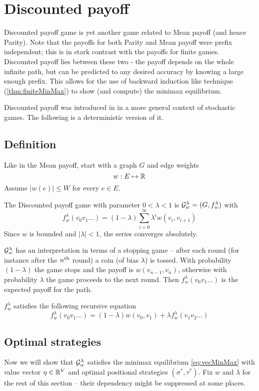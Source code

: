 \chapter{Discounted payoff}

Discounted payoff game is yet another game related to Mean payoff (and hence Parity). Note that the payoffs for both Parity and Mean payoff were prefix independent; this is in stark contrast with the payoffs for finite games. Discounted payoff lies between these two - the payoff depends on the whole infinite path, but can be predicted to any desired accuracy by knowing a large enough prefix. This allows for the use of backward induction like technique (\autoref{thm:finiteMinMax}) to show (and compute) the minimax equilibrium.

Discounted payoff was introduced in \cite{shapley_stochastic} in a more general context of stochastic games. The following is a deterministic version of it.

\section{Definition}
Like in the Mean payoff, start with a graph $G$ and edge weights
\[
    w : E \mapsto \mathbb{R}
\]
Assume $|w(e)| \leq W$ for every $e \in E$.

The Discounted payoff game with parameter $ 0 < \lambda < 1$ is $\mathcal{G}^\lambda_w=(G,f^\lambda_w)$ with
\[
    f^\lambda_w(v_0 v_1 \ldots ) =  (1-\lambda)\sum_{i=0}^\infty \lambda^i w(v_i,v_{i+1})
\]
Since $w$ is bounded and $|\lambda|<1$, the series converges absolutely.

$\mathcal{G}^\lambda_w$ has an interpretation in terms of a stopping game -- after each round (for instance after the ${n}^\text{th}$ round) a coin (of bias $\lambda$) is tossed. With probability $(1-\lambda)$ the game stops and the payoff is $w(v_{n-1},v_n)$, otherwise with probability $\lambda$ the game proceeds to the next round. Then $f^\lambda_w(v_0v_1 \ldots)$ is the expected payoff for the path.

$f^\lambda_w$ satisfies the following recursive equation
\begin{equation}
    f^\lambda_w(v_0 v_1 \ldots ) = (1-\lambda) w(v_0, v_1) + \lambda f^\lambda_w(v_1 v_2 \ldots) \label{eqn:disc-recursive}
\end{equation}
\section{Optimal strategies}
Now we will show that $\mathcal{G}^\lambda_w$ satisfies the minimax equilibrium \eqref{eq:vecMinMax} with value vector $\eta \in \mathbb{R}^V$ and optimal positional strategies $(\sigma^*, \tau^*)$. Fix $w$ and $\lambda$ for the rest of this section -- their dependency might be suppressed at some places.

